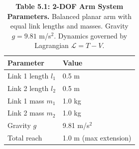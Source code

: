 \begin{table}[H]
\centering
\caption{\textbf{Table 5.1: 2-DOF Arm System Parameters.} Balanced planar arm with equal link lengths and masses. Gravity $g = 9.81$ m/s$^2$. Dynamics governed by Lagrangian $\mathcal{L} = T - V$.}
\label{tab:5-1}
\small
\begin{tabular}{ll}
\toprule
\textbf{Parameter} & \textbf{Value} \\
\midrule
\rowcolor{gray!15}
Link 1 length $l_1$ & 0.5 m \\
Link 2 length $l_2$ & 0.5 m \\
\rowcolor{gray!15}
Link 1 mass $m_1$ & 1.0 kg \\
Link 2 mass $m_2$ & 1.0 kg \\
\rowcolor{gray!15}
Gravity $g$ & 9.81 m/s$^2$ \\
Total reach & 1.0 m (max extension) \\
\bottomrule
\end{tabular}
\end{table}
